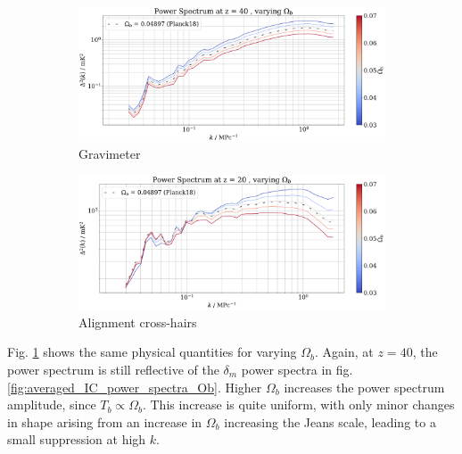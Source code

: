 \documentclass[floats,floatfix,showpacs,amssymb,prd,superscriptaddress,nofootinbib]{revtex4-2} %
\begin{document}
\begin{figure}[H]
     \centering
     \begin{subfigure}[b]{0.9\textwidth}
         \centering
         \includegraphics[width=\textwidth]{images/simulation_results/power_spectrum_fixed_z_40_Ob.png}
         \caption{Gravimeter}
         \label{fig:power_spectrum_fixed_z_40_Ob}
     \end{subfigure}
     \hfill
     \begin{subfigure}[b]{0.9\textwidth}
         \centering
         \includegraphics[width=\textwidth]{images/simulation_results/power_spectrum_fixed_z_20_Ob.png}
         \caption{Alignment cross-hairs}
         \label{fig:power_spectrum_fixed_z_20_Ob}
     \end{subfigure}
        \caption{}
        \label{fig:power_spectrum_fixed_z_Ob}
\end{figure}

Fig. \ref{fig:power_spectrum_fixed_z_40_Ob} shows the same physical quantities for varying $\Omega_b$. Again, at $z = 40$, the power spectrum is still reflective of the $\delta_m$ power spectra in fig. \ref{fig:averaged_IC_power_spectra_Ob}. Higher $\Omega_b$ increases the power spectrum amplitude, since $T_b \propto \Omega_b$.  This increase is quite uniform, with only minor changes in shape arising from an increase in $\Omega_b$ increasing the Jeans scale, leading to a small suppression at high $k$. 
\end{document}
